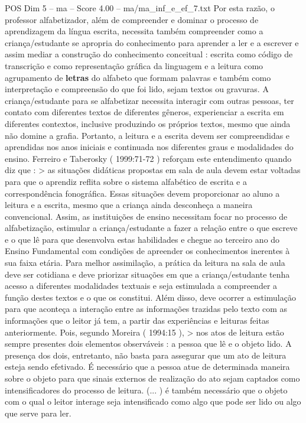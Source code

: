 \begin{textsample}{POS Dim 5 – ma – Score 4.00 – ma/ma\_inf\_e\_ef\_7.txt}
Por esta razão, o professor alfabetizador, além de compreender e dominar o processo de aprendizagem da língua escrita, necessita também compreender como a criança/estudante se apropria do conhecimento para aprender a ler e a escrever e assim mediar a construção do conhecimento conceitual : escrita como código de transcrição e como representação gráfica da linguagem e a leitura como agrupamento de \textbf{letras} do alfabeto que formam palavras e também como interpretação e compreensão do que foi lido, sejam textos ou gravuras.
A criança/estudante para se alfabetizar necessita interagir com outras pessoas, ter contato com diferentes textos de diferentes gêneros, experienciar a escrita em diferentes contextos, inclusive produzindo os próprios textos, mesmo que ainda não domine a grafia.
Portanto, a leitura e a escrita devem ser compreendidas e aprendidas nos anos iniciais e continuada nos diferentes graus e modalidades do ensino.
Ferreiro e Taberosky ( 1999:71-72 ) reforçam este entendimento quando diz que : > as situações didáticas propostas em sala de aula devem estar voltadas para que o aprendiz reflita sobre o sistema alfabético de escrita e a correspondência fonográfica.
Essas situações devem proporcionar ao aluno a leitura e a escrita, mesmo que a criança ainda desconheça a maneira convencional.
Assim, as instituições de ensino necessitam focar no processo de alfabetização, estimular a criança/estudante a fazer a relação entre o que escreve e o que lê para que desenvolva estas habilidades e chegue ao terceiro ano do Ensino Fundamental com condições de apreender os conhecimentos inerentes à sua faixa etária.
Para melhor assimilação, a prática da leitura na sala de aula deve ser cotidiana e deve priorizar situações em que a criança/estudante tenha acesso a diferentes modalidades textuais e seja estimulada a compreender a função destes textos e o que os constitui.
Além disso, deve ocorrer a estimulação para que aconteça a interação entre as informações trazidas pelo texto com as informações que o leitor já tem, a partir das experiências e leituras feitas anteriormente.
Pois, segundo Moreira ( 1994:15 ), > nos atos de leitura estão sempre presentes dois elementos observáveis : a pessoa que lê e o objeto lido.
A presença dos dois, entretanto, não basta para assegurar que um ato de leitura esteja sendo efetivado.
É necessário que a pessoa atue de determinada maneira sobre o objeto para que sinais externos de realização do ato sejam captados como intensificadores do processo de leitura. (... ) é também necessário que o objeto com o qual o leitor interage seja intensificado como algo que pode ser lido ou algo que serve para ler.

\end{textsample}
